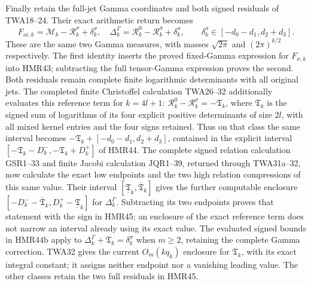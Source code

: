 Finally retain the full-jet Gamma coordinates and both signed
residuals of TWA18--24. Their exact arithmetic return becomes
\[
 F_{\mathrm{ar},k}=\mathcal M_k-\mathcal R_k^\sigma+\delta_k^\sigma,
 \quad
 \Delta_k^\Gamma=\mathcal R_k^0-\mathcal R_k^\sigma+\delta_k^\sigma,
 \qquad
 \delta_k^\sigma\in[-d_0-d_1,d_2+d_3].
 \tag{HMR45}
\]
These are the same two Gamma measures, with masses
$\sqrt{2\pi}$ and $(2\pi)^{k/2}$ respectively. The first
identity inserts the proved fixed-Gamma expression for
$F_{\sigma,k}$ into HMR43; subtracting the full tensor-Gamma
expression proves the second. Both residuals remain complete
finite logarithmic determinants with all original jets.
The completed finite Christoffel calculation TWA26--32
additionally evaluates this reference term for $k=4l+1$:
$\mathcal R_k^0-\mathcal R_k^\sigma=-\mathfrak T_k$,
where $\mathfrak T_k$ is the signed sum of logarithms of
its four explicit positive determinants of size $2l$, with all
mixed kernel entries and the four signs retained.
Thus on that class the same interval becomes
$-\mathfrak T_k+[-d_0-d_1,d_2+d_3]$, contained in the
explicit interval $[-\mathfrak T_k-D_k^-,
-\mathfrak T_k+D_k^+]$ of HMR44. The complete signed
relation calculation GSR1--33 and finite Jacobi calculation
JQR1--39, returned through TWA31a--32, now calculate the
exact low endpoints and the two high relation compressions
of this same value. Their interval
$[\underline{\mathfrak T}_k,\overline{\mathfrak T}_k]$
gives the further computable enclosure
$[-D_k^--\overline{\mathfrak T}_k,
D_k^+-\underline{\mathfrak T}_k]$ for $\Delta_k^\Gamma$.
Subtracting its two endpoints proves that statement with
the sign in HMR45; an enclosure of the exact reference term
does not narrow an interval already using its exact value.
The evaluated signed bounds in HMR44b apply to
$\Delta_k^\Gamma+\mathfrak T_k=\delta_k^\sigma$ when
$m\geq2$, retaining the complete Gamma correction.
TWA32 gives the current $O_m(kq_k)$ enclosure for
$\mathfrak T_k$, with its exact integral constant; it assigns
neither endpoint nor a vanishing leading value.
The other classes retain the two full residuals in HMR45.

